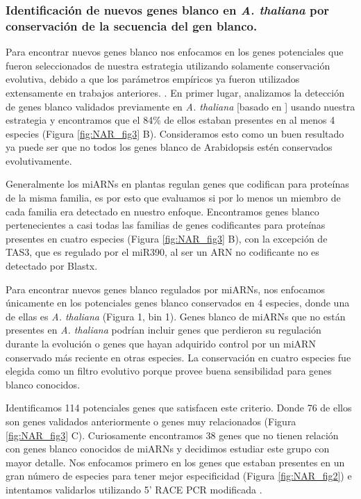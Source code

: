 \subsubsection{Identificación de nuevos genes blanco en \textit{A. thaliana} por conservación de la secuencia del gen blanco.}


Para encontrar nuevos genes blanco nos enfocamos en los genes potenciales que fueron seleccionados de nuestra estrategia utilizando solamente conservación evolutiva, debido a que los parámetros empíricos ya fueron utilizados extensamente en trabajos anteriores. \citep{Allen2005207,JonesRhoades2004787,Schwab2005517}.
En primer lugar, analizamos la detección de genes blanco validados previamente en \textit{A. thaliana} [basado en \citep{Fahlgren2010}] usando nuestra estrategia y encontramos que el 84\% de ellos estaban presentes en al menos 4 especies (Figura \ref{fig:NAR_fig3} B).
Consideramos esto como un buen resultado ya puede ser que no todos los genes blanco de Arabidopsis estén conservados evolutivamente.

Generalmente los miARNs en plantas regulan genes que codifican para proteínas de la misma familia, es por esto que evaluamos si por lo menos un miembro de cada familia era detectado en nuestro enfoque.
Encontramos genes blanco pertenecientes a casi todas las familias de genes codificantes para proteínas presentes en cuatro especies (Figura \ref{fig:NAR_fig3} B), con la excepción de TAS3, que es regulado por el miR390, al ser un ARN no codificante no es detectado por Blastx. 

Para encontrar nuevos genes blanco regulados por miARNs, nos enfocamos únicamente  en los potenciales genes blanco conservados en 4 especies, donde una de ellas es \textit{A. thaliana} (Figura 1, bin 1). 
Genes blanco de miARNs que no están presentes en \textit{A. thaliana} podrían incluir genes que perdieron su regulación durante la evolución o genes que hayan adquirido control por un miARN conservado más reciente en otras especies.
La conservación en cuatro especies fue elegida como un filtro evolutivo porque provee buena sensibilidad para genes blanco conocidos.

Identificamos 114 potenciales genes que satisfacen este criterio. Donde 76 de ellos son genes validados anteriormente o genes muy relacionados (Figura \ref{fig:NAR_fig3} C).
Curiosamente encontramos 38 genes que no tienen relación con genes blanco conocidos de miARNs y decidimos estudiar este grupo con mayor detalle.
Nos enfocamos primero en los genes que estaban presentes en un gran número de especies para tener mejor especificidad (Figura \ref{fig:NAR_fig2}) e intentamos validarlos utilizando 5' RACE PCR modificada \citep{Llave2002,Kasschau2003}.

